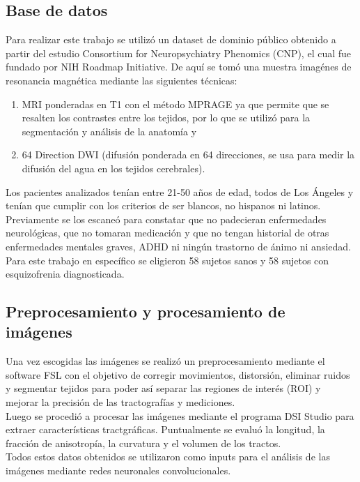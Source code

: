 \subsection{Base de datos}
Para realizar este trabajo se utilizó un dataset de dominio público obtenido a partir del estudio
Consortium for Neuropsychiatry Phenomics (CNP), el cual fue fundado por NIH Roadmap Initiative.
De aquí se tomó una muestra imagénes de resonancia magnética mediante las siguientes técnicas:
\begin{enumerate}[label=\alph*)]
    \item MRI ponderadas en T1 con el método MPRAGE ya que permite que se resalten los contrastes entre los tejidos,
          por lo que se utilizó para la segmentación y análisis de la anatomía y
    \item 64 Direction DWI (difusión ponderada en 64 direcciones, se usa para medir la difusión del agua
          en los tejidos cerebrales).
          \cite{bilder2020ucla}
\end{enumerate}

Los pacientes analizados tenían entre 21-50 años de edad, todos de Los Ángeles y tenían que cumplir
con los criterios de ser blancos, no hispanos ni latinos. Previamente se los escaneó para constatar
que no padecieran enfermedades neurológicas, que no tomaran medicación y que no tengan historial de
otras enfermedades mentales graves, ADHD ni ningún trastorno de ánimo ni ansiedad. \\
Para este trabajo en específico se eligieron 58 sujetos sanos y 58 sujetos con esquizofrenia diagnosticada.

\subsection{Preprocesamiento y procesamiento de imágenes}
Una vez escogidas las imágenes se realizó un preprocesamiento mediante el software FSL con el objetivo de
corregir movimientos, distorsión, eliminar ruidos y segmentar tejidos para poder así separar las regiones
de interés (ROI) y mejorar la precisión de las tractografías y mediciones.\\
Luego se procedió a procesar las imágenes mediante el programa DSI Studio para extraer características
tractgráficas. Puntualmente se evaluó la longitud, la fracción de anisotropía, la curvatura y el volumen
de los tractos. \\
Todos estos datos obtenidos se utilizaron como inputs para el análisis de las imágenes mediante redes
neuronales convolucionales.

